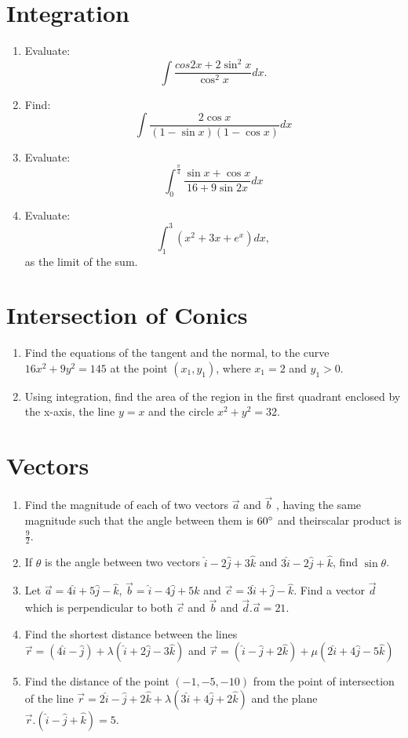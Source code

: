 \documentclass{article}
\providecommand{\brak}[1]{\ensuremath{\left(#1\right)}}
\begin{document}
\section{Integration}
\begin{enumerate}
\item Evaluate: \[\int \frac{cos 2x + 2\sin^{2} x}{\cos^{2}x}dx .\]	
\item Find: \[ \int \frac{2\cos x}{\brak{1-\sin x}\brak{1-\cos x}}dx \]
\item Evaluate:
	\[ \int_{0}^{\frac{\pi}{4}}\frac{\sin x + \cos x}{16 + 9 \sin 2x}dx \]
\item Evaluate:
	\[\int_{1}^{3} \brak{x^2 + 3x + e^x}dx, \]  as the limit of the sum.
\end{enumerate}
\section{Intersection of Conics}
\begin{enumerate}
\item Find the equations of the tangent and the normal, to the curve $16x^{2}+9y^{2}=145$ at the point $\brak{x_{1},y_{1}}$, where $x_{1}=2$ and $y_{1}>0$.
\item Using integration, find the area of the region in the first quadrant enclosed by the x-axis, the line $y = x$ and the circle $x^{2}+y^{2} = 32.$
\end{enumerate}
\section{Vectors}
\begin{enumerate}
\item Find the magnitude of each of two vectors $\vec{a}$ and $\vec{b}$ , having the same magnitude such that the angle  between them is $60\degree{}$ and theirscalar product is $\frac{9}{2}$.
\item If $\theta$ is the angle between two vectors $\hat{i}-2\hat{j}+3\hat{k}$ and $3\hat{i}-2\hat{j}+\hat{k}$, find $\sin\theta$.
\item Let $\vec{a}=4\hat{i}+5\hat{j}-\hat{k}$, $\vec{b}=\hat{i}-4\hat{j}+5\hat{k}$ and $\vec{c}=3\hat{i}+\hat{j}-\hat{k}$. Find a vector $\vec{d}$ which is perpendicular to both $\vec{c}$ and $\vec{b}$ and $\vec{d}.\vec{a}=21$.
\item Find the shortest distance between the lines \\ $\vec{r} = \brak{4\hat{i}-\hat{j}}+\lambda\brak{\hat{i}+2\hat{j}-3\hat{k}}$ and $\vec{r} = \brak{\hat{i}-\hat{j}+2\hat{k}}+ \mu\brak{2\hat{i}+4\hat{j}-5\hat{k}}$
\item Find the distance of the point \brak{-1,-5,-10} from the point of intersection of the line $\vec{r}=2\hat{i}-\hat{j}+2\hat{k}+\lambda{\brak{3\hat{i}+4\hat{j}+2\hat{k}}}$ and the plane $\vec{r}.\brak{\hat{i}-\hat{j}+\hat{k}}=5.$
\end{enumerate}
\end{document}
